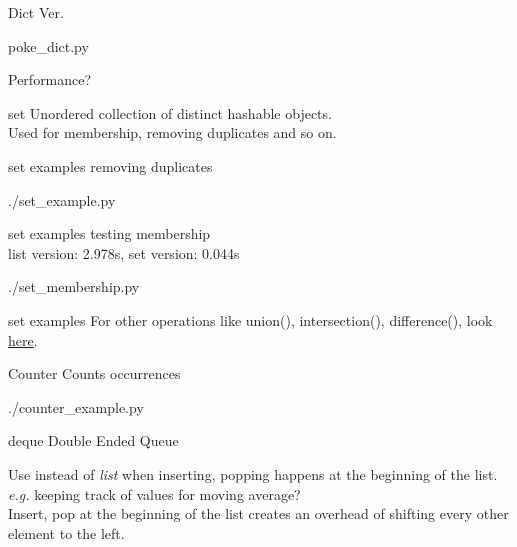 \documentclass{beamer}
\begin{document}
\begin{frame}{Dict Ver.}
  \begin{lstinputlisting}
    {poke_dict.py}
  \end{lstinputlisting}
\end{frame}

\begin{frame}{Performance?}

\end{frame}

\begin{frame}{set}
  Unordered collection of distinct hashable objects.\\
  Used for membership, removing duplicates and so on.
\end{frame}


\begin{frame}{set examples}
  removing duplicates
  \begin{lstinputlisting}
    {./set_example.py}
  \end{lstinputlisting}
\end{frame}

\begin{frame}{set examples}
  testing membership\\
  list version: 2.978s, set version: 0.044s
  \begin{lstinputlisting}
    {./set_membership.py}
  \end{lstinputlisting}
\end{frame}

\begin{frame}{set examples}
  For other operations like union(), intersection(), difference(), look
  \href{https://docs.python.org/2/library/stdtypes.html\#set}{here}.
\end{frame}

\begin{frame}{Counter}
  Counts occurrences
  \begin{lstinputlisting}
    {./counter_example.py}
  \end{lstinputlisting}
\end{frame}

\begin{frame}{deque}
  Double Ended Queue

  Use instead of \textit{list} when inserting, popping happens at the beginning
  of the list. \textit{e.g.} keeping track of values for moving average?\\
  Insert, pop at the beginning of the list creates an overhead of
  shifting every other element to the left.\\
\end{frame}
\end{document}
